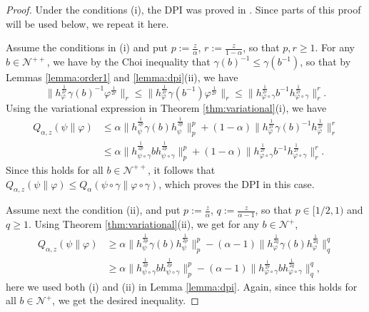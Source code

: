 \documentclass[12pt]{article}
\theoremstyle{definition}
\theoremstyle{remark}
\numberwithin{equation}{section}
\def\Ne{\mathcal N}
\begin{document}
\begin{proof}
Under the conditions (i), the DPI was proved in \cite[Theorem 1(viii)]{kato2023onrenyi}.
Since parts of this proof will be used below, we repeat it here.

Assume the conditions in (i) and put $p:=\frac{z}{\alpha}$, $r:=\frac{z}{1-\alpha}$, so that $p,r\ge 1$. 
For any $b\in \Ne^{++}$, we have by  the Choi inequality \cite{choi1974aschwarz} 
that  $\gamma(b)^{-1}\le \gamma(b^{-1})$, so that  by Lemmas \ref{lemma:order1} and
\ref{lemma:dpi}(ii), we have 
\begin{equation}\label{eq:ineq}
\Big\|h_\varphi^{\frac{1}{2r}}\gamma(b)^{-1}\varphi^{\frac{1}{2r}}\Big\|_r\le
\Big\|h_\varphi^{\frac{1}{2r}}\gamma(b^{-1})\varphi^{\frac{1}{2r}}\Big\|_r\le
\Big\|h_{\varphi\circ\gamma}^{\frac{1}{2r}}b^{-1}h_{\varphi\circ\gamma}^{\frac{1}{2r}}\Big\|_r^r .
\end{equation}
Using the variational expression in Theorem \ref{thm:variational}(i), we have
\begin{align*}
Q_{\alpha,z}(\psi\|\varphi)&\le \alpha\|h_\psi^{\frac{1}{2p}}\gamma(b)h_\psi^{\frac{1}{2p}}\|_p^p+
(1-\alpha)\|h_\varphi^{\frac{1}{2r}}\gamma(b)^{-1}h_\varphi^{\frac{1}{2r}}\|_r^r\\
&\le  \alpha\|h_{\psi\circ\gamma}^{\frac{1}{2p}}bh_{\psi\circ\gamma}^{\frac{1}{2p}}\|_p^p+
(1-\alpha)\|h_{\varphi\circ\gamma}^{\frac{1}{2r}}b^{-1}h_{\varphi\circ\gamma}^{\frac{1}{2r}}\|_r^r.
\end{align*}
 Since this holds for all
$b\in \Ne^{++}$, it follows that $Q_{\alpha,z}(\psi\|\varphi)\le
Q_{\alpha}(\psi\circ\gamma\|\varphi\circ\gamma)$, which proves the DPI in this case.

Assume next the condition (ii), and put $p:=\frac{z}{\alpha}$, $q:=\frac{z}{\alpha-1}$, so
that $p\in [1/2,1)$ and $q\ge 1$. Using Theorem
\ref{thm:variational}(ii), we get for any $b\in \Ne^+$,
\begin{align*}
Q_{\alpha,z}(\psi\|\varphi)&\ge
\alpha\|h_\psi^{\frac{1}{2p}}\gamma(b)h_\psi^{\frac{1}{2p}}\|_p^p-
(\alpha-1)\|h_\varphi^{\frac{1}{2q}}\gamma(b)h_\varphi^{\frac{1}{2q}}\|_q^q\\
&\ge \alpha\|h_{\psi\circ\gamma}^{\frac{1}{2p}}bh_{\psi\circ\gamma}^{\frac{1}{2p}}\|_p^p-
(\alpha-1)\|h_{\varphi\circ\gamma}^{\frac{1}{2r}}bh_{\varphi\circ\gamma}^{\frac{1}{2q}}\|_q^q,
\end{align*}
here we used both (i) and (ii) in Lemma \ref{lemma:dpi}. Again, since this holds for all
$b\in \Ne^+$, we get the desired inequality.
\end{proof}
\end{document}
